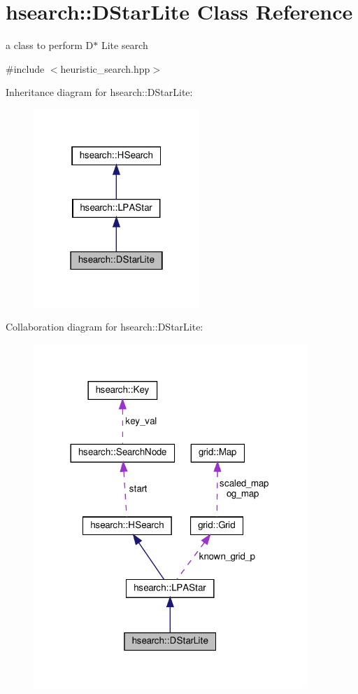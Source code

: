 \hypertarget{classhsearch_1_1DStarLite}{}\section{hsearch\+:\+:D\+Star\+Lite Class Reference}
\label{classhsearch_1_1DStarLite}


a class to perform D$\ast$ Lite search  




{\ttfamily \#include $<$heuristic\+\_\+search.\+hpp$>$}



Inheritance diagram for hsearch\+:\+:D\+Star\+Lite\+:\nopagebreak
\begin{figure}[H]
\begin{center}
\leavevmode
\includegraphics[width=178pt]{d1/d7e/classhsearch_1_1DStarLite__inherit__graph}
\end{center}
\end{figure}


Collaboration diagram for hsearch\+:\+:D\+Star\+Lite\+:\nopagebreak
\begin{figure}[H]
\begin{center}
\leavevmode
\includegraphics[width=293pt]{d4/d60/classhsearch_1_1DStarLite__coll__graph}
\end{center}
\end{figure}
